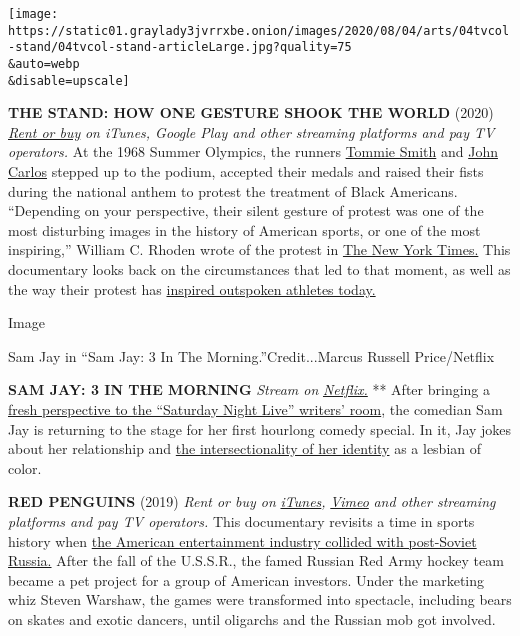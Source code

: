 \texttt{[image: https://static01.graylady3jvrrxbe.onion/images/2020/08/04/arts/04tvcol-stand/04tvcol-stand-articleLarge.jpg?quality=75\\\&auto=webp\\\&disable=upscale]}

\textbf{THE STAND: HOW ONE GESTURE SHOOK THE WORLD} (2020)
\href{https://tv.apple.com/us/movie/the-stand-how-one-gesture-shook-the-world/umc.cmc.hw5jhieqcimd8aiuxc8pnx1w}{\emph{Rent
or buy}} \emph{on iTunes, Google Play and other streaming platforms and
pay TV operators.} At the 1968 Summer Olympics, the runners
\href{https://www.nytimes3xbfgragh.onion/2020/06/13/sports/tommie-smith-protest-colin-kaepernick.html}{Tommie
Smith} and
\href{https://www.nytimes3xbfgragh.onion/2011/10/11/sports/john-carlos-of-68-olympics-protest-maintains-his-passion.html}{John
Carlos} stepped up to the podium, accepted their medals and raised their
fists during the national anthem to protest the treatment of Black
Americans. ``Depending on your perspective, their silent gesture of
protest was one of the most disturbing images in the history of American
sports, or one of the most inspiring,'' William C. Rhoden wrote of the
protest in
\href{https://www.nytimes3xbfgragh.onion/2016/07/18/sports/olympics/john-carlos-tommie-smith-committee-apology.html}{The
New York Times.} This documentary looks back on the circumstances that
led to that moment, as well as the way their protest has
\href{https://www.nytimes3xbfgragh.onion/2018/09/06/sports/kaepernick-nike-kneeling.html}{inspired
outspoken athletes today.}

Image

Sam Jay in ``Sam Jay: 3 In The Morning.''Credit...Marcus Russell
Price/Netflix

\textbf{SAM JAY: 3 IN THE MORNING} \emph{Stream on}
\href{https://www.netflix.com/search?q=sam\%20jay\&jbv=81078802}{\emph{Netflix.}}
** After bringing a
\href{https://www.vice.com/en_us/article/ywnn3x/snls-kenan-thompson-and-sam-jay-want-to-make-everyone-laugh}{fresh
perspective to the ``Saturday Night Live'' writers' room}, the comedian
Sam Jay is returning to the stage for her first hourlong comedy special.
In it, Jay jokes about her relationship and
\href{https://www.youtube.com/watch?v=D2EcvFfzu-o}{the intersectionality
of her identity} as a lesbian of color.

\textbf{RED PENGUINS} (2019) \emph{Rent or buy on}
\href{https://tv.apple.com/us/movie/red-penguins/umc.cmc.1a55rxdxlme2cwu9ylp4edln7}{\emph{iTunes}}\emph{,}
\href{https://vimeo.com/ondemand/redpenguins}{\emph{Vimeo}} \emph{and
other streaming platforms and pay TV operators.} This documentary
revisits a time in sports history when
\href{https://www.nytimes3xbfgragh.onion/1994/03/28/sports/hockey-from-russia-with-endorsements.html}{the
American entertainment industry collided with post-Soviet Russia.} After
the fall of the U.S.S.R., the famed Russian Red Army hockey team became
a pet project for a group of American investors. Under the marketing
whiz Steven Warshaw, the games were transformed into spectacle,
including bears on skates and exotic dancers, until oligarchs and the
Russian mob got involved.

